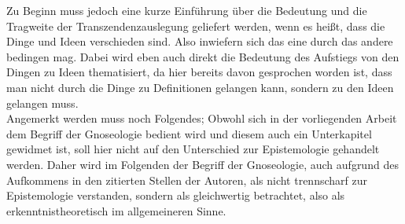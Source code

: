 Zu Beginn muss jedoch eine kurze Einführung über die Bedeutung und die Tragweite der Transzendenzauslegung geliefert werden, wenn es heißt, dass die Dinge und Ideen verschieden sind. Also inwiefern sich das eine durch das andere bedingen mag. Dabei wird eben auch direkt die Bedeutung des Aufstiegs von den Dingen zu Ideen thematisiert, da hier bereits davon gesprochen worden ist, dass man nicht durch die Dinge zu Definitionen gelangen kann, sondern zu den Ideen gelangen muss.\\
Angemerkt werden muss noch Folgendes; Obwohl sich in der vorliegenden Arbeit dem Begriff der Gnoseologie bedient wird und diesem auch ein Unterkapitel gewidmet ist, soll hier nicht auf den Unterschied zur Epistemologie gehandelt werden. Daher wird im Folgenden der Begriff der Gnoseologie, auch aufgrund des Aufkommens in den zitierten Stellen der Autoren, als nicht trennscharf zur Epistemologie verstanden, sondern als gleichwertig betrachtet, also als erkenntnistheoretisch im allgemeineren Sinne.




